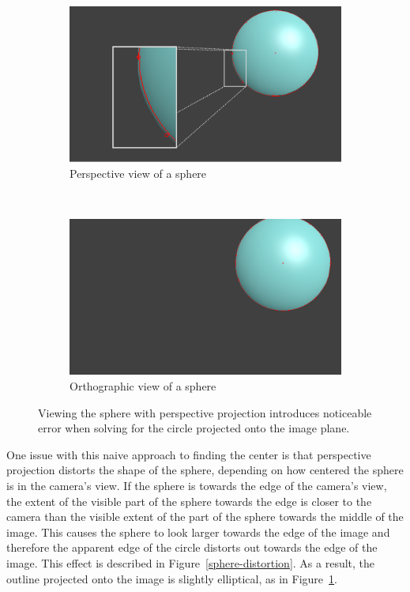 \documentclass{thesis}
\begin{document}
\begin{figure}
	\centering
	\begin{subfigure}[b]{0.4\textwidth}
                \includegraphics[width=\textwidth]{sphere-perspective-zoom}
                \caption{Perspective view of a sphere}
    \end{subfigure}
    ~
   	\begin{subfigure}[b]{0.4\textwidth}
                \includegraphics[width=\textwidth]{sphere-ortho}
                \caption{Orthographic view of a sphere}
    \end{subfigure}
    \caption{Viewing the sphere with perspective projection introduces noticeable error when solving for the circle projected onto the image plane.}
	\label{sphere-perspective-ortho}
\end{figure}

One issue with this naive approach to finding the center is that perspective projection distorts the shape of the sphere, depending on how centered the sphere is in the camera's view. If the sphere is towards the edge of the camera's view, the extent of the visible part of the sphere towards the edge is closer to the camera than the visible extent of the part of the sphere towards the middle of the image. This causes the sphere to look larger towards the edge of the image and therefore the apparent edge of the circle distorts out towards the edge of the image. This effect is described in Figure~\ref{sphere-distortion}. As a result, the outline projected onto the image is slightly elliptical, as in Figure~\ref{sphere-perspective-ortho}.
\end{document}
